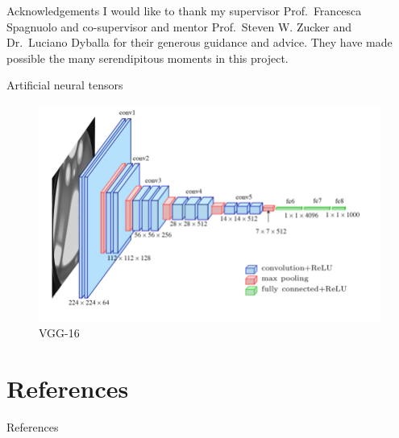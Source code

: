 \documentclass[xcolor={dvipsnames,svgnames}]{beamer}
\begin{document}
\begin{frame}{Acknowledgements}
I would like to thank my supervisor Prof.~Francesca Spagnuolo  and co-supervisor and mentor Prof.~Steven W. Zucker and Dr.~Luciano Dyballa for their generous guidance and advice. They have made possible the many serendipitous moments in this project. 
\end{frame}
\begin{frame}{Artificial neural tensors}
        \begin{figure}
            \includegraphics[width=\textwidth]{figures/artificial/vgg16.png}
            \caption{VGG-16}
        \end{figure} 
\end{frame}
\section{References}
\begin{frame}{References}


\end{frame}
\end{document}
